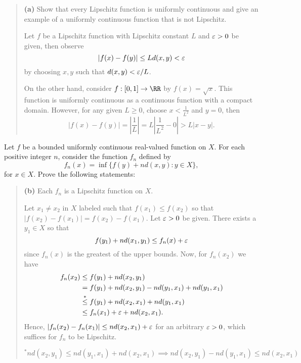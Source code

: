 \documentclass{homework}
\begin{document}
\begin{quote}
  {\bf (a)} Show that every Lipschitz function is uniformly continuous and give an example of a uniformly continuous function that is not Lipschitz.
  \begin{solution}
    Let $f$ be a Lipschitz function with Lipschitz constant $L$ and $\varepsilon >0$ be given, then observe
    $$
      |f(x) - f(y)| \le Ld(x,y) < \varepsilon
    $$
    by choosing $x,y$ such that $d(x,y)<\varepsilon/L$.

    On the other hand, consider $f:[0,1] \to \RR$ by $f(x) = \sqrt x$.  This function is uniformly continuous as a continuous function with a compact domain. However, for any given $L\ge0$, choose $x<\frac 1{L^2}$ and $y=0$, then 
    $$
      |f(x) - f(y)| = \left|\frac 1L\right| = L\left|\frac 1{L^2} - 0\right| > L|x - y|.
    $$
  \end{solution}
\end{quote}
Let $f$ be a bounded uniformly continuous real-valued function on $X$.  For each positive integer $n$, consider the function $f_n$ defined by
$$
  f_n(x) = \inf\{f(y) + nd(x,y):y\in X\},
$$
for $x\in X$.  Prove the following statements:
\begin{quote}
  {\bf (b)} Each $f_n$ is a Lipschitz function on $X$.
  \begin{solution}
    Let $x_1 \not= x_2$ in $X$ labeled such that $f(x_1) \le f(x_2)$ so that $|f(x_2) - f(x_1)| = f(x_2) - f(x_1)$. Let $\varepsilon > 0$ be given.  There exists a $y_1 \in X$ so that 
    $$
      f(y_1) + nd(x_1,y_1) \le f_n(x) + \varepsilon
    $$
    since $f_n(x)$ is the greatest of the upper bounds.  Now, for $f_n(x_2)$ we have
    \begin{align*}
      f_n(x_2) 
      &\le f(y_1) + nd(x_2,y_1)\\
      &=   f(y_1) + nd(x_2,y_1) - nd(y_1,x_1)+ nd(y_1,x_1)\\
      &\stackrel*\le f(y_1) + nd(x_2,x_1) + nd(y_1,x_1)\\
      &\le f_n(x_1) + \varepsilon +nd(x_2,x_1).
    \end{align*} 
    Hence, $|f_n(x_2) - f_n(x_1)| \le nd(x_2,x_1) + \varepsilon$ for an arbitrary $\varepsilon >0$, which suffices for $f_n$ to be Lipschitz.

    $$
    ^*nd(x_2,y_1) \le nd(y_1,x_1) + nd(x_2,x_1) \implies nd(x_2,y_1) - nd(y_1,x_1)\le nd(x_2,x_1) 
    $$
  \end{solution}
\end{quote}
\end{document}
